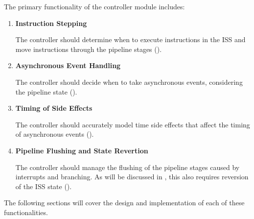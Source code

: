 The primary functionality of the controller module includes:
\begin{enumerate}
    \item \textbf{Instruction Stepping} 
    \par The controller should determine when to execute instructions in the ISS and move instructions through the pipeline stages ().
    
    \item \textbf{Asynchronous Event Handling}
    \par The controller should decide when to take asynchronous events, considering the pipeline state ().

    \item \textbf{Timing of Side Effects} 
    \par The controller should accurately model time side effects that affect the timing of asynchronous events ().
    
    \item \textbf{Pipeline Flushing and State Revertion}
    \par The controller should manage the flushing of the pipeline stages caused by interrupts and branching. As will be discussed in , this also requires reversion of the ISS state ().
\end{enumerate}

The following sections will cover the design and implementation of each of these functionalities. 

%

